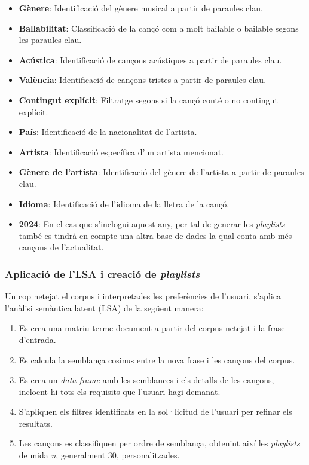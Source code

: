\begin{itemize}
    \item \textbf{Gènere}: Identificació del gènere musical a partir de paraules clau.
    \item \textbf{Ballabilitat}: Classificació de la cançó com a molt bailable o bailable segons les paraules clau.
    \item \textbf{Acústica}: Identificació de cançons acústiques a partir de paraules clau.
    \item \textbf{València}: Identificació de cançons tristes a partir de paraules clau.
    \item \textbf{Contingut explícit}: Filtratge segons si la cançó conté o no contingut explícit.
    \item \textbf{País}: Identificació de la nacionalitat de l'artista.
    \item \textbf{Artista}: Identificació específica d'un artista mencionat.
    \item \textbf{Gènere de l'artista}: Identificació del gènere de l'artista a partir de paraules clau.
    \item \textbf{Idioma}: Identificació de l'idioma de la lletra de la cançó.
    \item \textbf{2024}: En el cas que s'inclogui aquest any, per tal de generar les \textit{playlists} també es tindrà en compte una altra base de dades la qual conta amb més cançons de l'actualitat.
\end{itemize}

\subsubsection{Aplicació de l'LSA i creació de \textit{playlists}}

Un cop netejat el corpus i interpretades les preferències de l'usuari, s'aplica l'anàlisi semàntica latent (LSA) de la següent manera:

\begin{enumerate}
    \item Es crea una matriu terme-document a partir del corpus netejat i la frase d'entrada.
    \item Es calcula la semblança cosinus entre la nova frase i les cançons del corpus.
    \item Es crea un \textit{data frame} amb les semblances i els detalls de les cançons, incloent-hi tots els requisits que l'usuari hagi demanat.
    \item S'apliquen els filtres identificats en la sol·licitud de l'usuari per refinar els resultats.
    \item Les cançons es classifiquen per ordre de semblança, obtenint així les \textit{playlists} de mida \textit{n}, generalment 30, personalitzades.
\end{enumerate}

